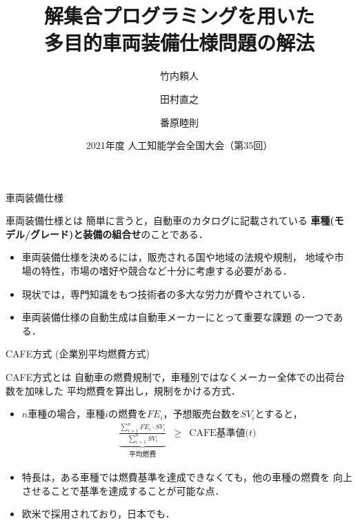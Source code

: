 \documentclass[dvipdfmx, 11pt]{beamer}
\title{解集合プログラミングを用いた\\多目的車両装備仕様問題の解法}
\author{竹内頼人\inst{1} \and 田村直之\inst{2} \and 番原睦則\inst{1}}
\institute{\inst{1}名古屋大学 大学院情報学研究科 \and \inst{2}神戸大学 情報基盤センター}
\date{2021年度 人工知能学会全国大会（第35回）}
\begin{document}
\frame{\titlepage}
\begin{frame}{車両装備仕様}
  \begin{alertblock}{車両装備仕様とは}
    簡単に言うと，自動車のカタログに記載されている
    \textbf{車種(モデル/グレード)と装備の組合せ}のことである．
  \end{alertblock}

  \begin{itemize}
  \item 車両装備仕様を決めるには，販売される国や地域の法規や規制，
	地域や市場の特性，市場の嗜好や競合など十分に考慮する必要がある．
  \item 現状では，専門知識をもつ技術者の多大な労力が費やされている．
  \item 車両装備仕様の自動生成は自動車メーカーにとって重要な課題
	の一つである．
  \end{itemize}

\end{frame}
\begin{frame}{CAFE方式 (企業別平均燃費方式)}
 \begin{alertblock}{CAFE方式とは}
  自動車の燃費規制で，車種別ではなくメーカー全体での出荷台数を加味した
  平均燃費を算出し，規制をかける方式．
 \end{alertblock}
 \begin{itemize}
  \item $n$車種の場合，車種$i$の燃費を$FE_i$，予想販売台数を$SV_i$とすると，
    \[
      \begin{array}{lcr}
        \underbrace{
        \frac{\sum_{i=1}^{n} FE_{i}\cdot SV_{i}}
        {\sum_{i=1}^{n} SV_{i}}}_{\textrm{平均燃費}
        }
        &
        \geq 
        &
        \textrm{CAFE基準値($t$)}
      \end{array}
    \]
  \item 特長は，ある車種では燃費基準を達成できなくても，他の車種の燃費を
    向上させることで基準を達成することが可能な点．
  \item 欧米で採用されており，日本でも．
 \end{itemize}
\end{frame}
\end{document}
